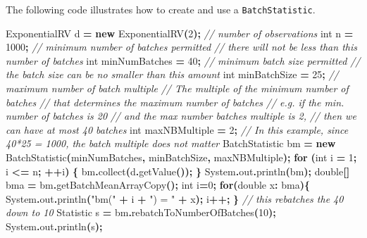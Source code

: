 \documentclass[
]{book}
\newenvironment{Shaded}{\begin{snugshade}}{\end{snugshade}}
\newcommand{\BuiltInTok}[1]{#1}
\newcommand{\CommentTok}[1]{\textcolor[rgb]{0.56,0.35,0.01}{\textit{#1}}}
\newcommand{\ControlFlowTok}[1]{\textcolor[rgb]{0.13,0.29,0.53}{\textbf{#1}}}
\newcommand{\DataTypeTok}[1]{\textcolor[rgb]{0.13,0.29,0.53}{#1}}
\newcommand{\DecValTok}[1]{\textcolor[rgb]{0.00,0.00,0.81}{#1}}
\newcommand{\FunctionTok}[1]{\textcolor[rgb]{0.00,0.00,0.00}{#1}}
\newcommand{\KeywordTok}[1]{\textcolor[rgb]{0.13,0.29,0.53}{\textbf{#1}}}
\newcommand{\NormalTok}[1]{#1}
\newcommand{\OperatorTok}[1]{\textcolor[rgb]{0.81,0.36,0.00}{\textbf{#1}}}
\newcommand{\StringTok}[1]{\textcolor[rgb]{0.31,0.60,0.02}{#1}}
\theoremstyle{definition}
\theoremstyle{definition}
\theoremstyle{definition}
\theoremstyle{definition}
\theoremstyle{remark}
\begin{document}
The following code illustrates how to create and use a \texttt{BatchStatistic}.

\begin{Shaded}
\begin{Highlighting}[]
\NormalTok{ExponentialRV d }\OperatorTok{=} \KeywordTok{new} \FunctionTok{ExponentialRV}\OperatorTok{(}\DecValTok{2}\OperatorTok{);}
\CommentTok{// number of observations}
\DataTypeTok{int}\NormalTok{ n }\OperatorTok{=} \DecValTok{1000}\OperatorTok{;} 
\CommentTok{// minimum number of batches permitted}
\CommentTok{// there will not be less than this number of batches}
\DataTypeTok{int}\NormalTok{ minNumBatches }\OperatorTok{=} \DecValTok{40}\OperatorTok{;}
\CommentTok{// minimum batch size permitted}
\CommentTok{// the batch size can be no smaller than this amount}
\DataTypeTok{int}\NormalTok{ minBatchSize }\OperatorTok{=} \DecValTok{25}\OperatorTok{;} 
\CommentTok{// maximum number of batch multiple}
\CommentTok{//  The multiple of the minimum number of batches}
\CommentTok{//  that determines the maximum number of batches}
\CommentTok{//  e.g. if the min. number of batches is 20}
\CommentTok{//  and the max number batches multiple is 2,}
\CommentTok{//  then we can have at most 40 batches}
\DataTypeTok{int}\NormalTok{ maxNBMultiple }\OperatorTok{=} \DecValTok{2}\OperatorTok{;} 
\CommentTok{// In this example, since 40*25 = 1000, the batch multiple does not matter}
\NormalTok{BatchStatistic bm }\OperatorTok{=} \KeywordTok{new} \FunctionTok{BatchStatistic}\OperatorTok{(}\NormalTok{minNumBatches}\OperatorTok{,}\NormalTok{ minBatchSize}\OperatorTok{,}\NormalTok{ maxNBMultiple}\OperatorTok{);}
\ControlFlowTok{for} \OperatorTok{(}\DataTypeTok{int}\NormalTok{ i }\OperatorTok{=} \DecValTok{1}\OperatorTok{;}\NormalTok{ i }\OperatorTok{\textless{}=}\NormalTok{ n}\OperatorTok{;} \OperatorTok{++}\NormalTok{i}\OperatorTok{)} \OperatorTok{\{}
\NormalTok{    bm}\OperatorTok{.}\FunctionTok{collect}\OperatorTok{(}\NormalTok{d}\OperatorTok{.}\FunctionTok{getValue}\OperatorTok{());}
\OperatorTok{\}}
\BuiltInTok{System}\OperatorTok{.}\FunctionTok{out}\OperatorTok{.}\FunctionTok{println}\OperatorTok{(}\NormalTok{bm}\OperatorTok{);}
\DataTypeTok{double}\OperatorTok{[]}\NormalTok{ bma }\OperatorTok{=}\NormalTok{ bm}\OperatorTok{.}\FunctionTok{getBatchMeanArrayCopy}\OperatorTok{();}
\DataTypeTok{int}\NormalTok{ i}\OperatorTok{=}\DecValTok{0}\OperatorTok{;}
\ControlFlowTok{for}\OperatorTok{(}\DataTypeTok{double}\NormalTok{ x}\OperatorTok{:}\NormalTok{ bma}\OperatorTok{)\{}
    \BuiltInTok{System}\OperatorTok{.}\FunctionTok{out}\OperatorTok{.}\FunctionTok{println}\OperatorTok{(}\StringTok{"bm("} \OperatorTok{+}\NormalTok{ i }\OperatorTok{+} \StringTok{") = "} \OperatorTok{+}\NormalTok{ x}\OperatorTok{);}
\NormalTok{    i}\OperatorTok{++;}
\OperatorTok{\}}
\CommentTok{// this rebatches the 40 down to 10}
\NormalTok{Statistic s }\OperatorTok{=}\NormalTok{ bm}\OperatorTok{.}\FunctionTok{rebatchToNumberOfBatches}\OperatorTok{(}\DecValTok{10}\OperatorTok{);}
\BuiltInTok{System}\OperatorTok{.}\FunctionTok{out}\OperatorTok{.}\FunctionTok{println}\OperatorTok{(}\NormalTok{s}\OperatorTok{);}
\end{Highlighting}
\end{Shaded}
\end{document}
